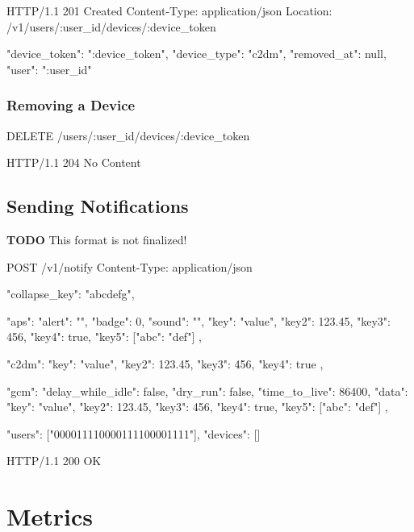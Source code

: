 \documentclass[12pt]{article}
\begin{document}
\begin{Terminal}
HTTP/1.1 201 Created
Content-Type: application/json
Location: /v1/users/:user_id/devices/:device_token

{
  "device_token": ":device_token",
  "device_type": "c2dm",
  "removed_at": null,
  "user": ":user_id"
}
\end{Terminal}

\subsubsection{Removing a Device}

\begin{Terminal}
DELETE /users/:user_id/devices/:device_token
\end{Terminal}

\begin{Terminal}
HTTP/1.1 204 No Content
\end{Terminal}

\subsection{Sending Notifications}

\textbf{TODO} This format is not finalized!

\begin{Terminal}
POST /v1/notify
Content-Type: application/json

{
  "collapse_key": "abcdefg",

  "aps": {
    "alert": "",
    "badge": 0,
    "sound": "",
    "key": "value",
    "key2": 123.45,
    "key3": 456,
    "key4": true,
    "key5": [{"abc": "def"}]
  },

  "c2dm": {
    "key": "value",
    "key2": 123.45,
    "key3": 456,
    "key4": true
  },

  "gcm": {
    "delay_while_idle": false,
    "dry_run": false,
    "time_to_live": 86400,
    "data": {
      "key": "value",
      "key2": 123.45,
      "key3": 456,
      "key4": true,
      "key5": [{"abc": "def"}]
    }
  },

  "users": ["000011110000111100001111"],
  "devices": []
}
\end{Terminal}

\begin{Terminal}
HTTP/1.1 200 OK
\end{Terminal}

\section{Metrics}
\end{document}
